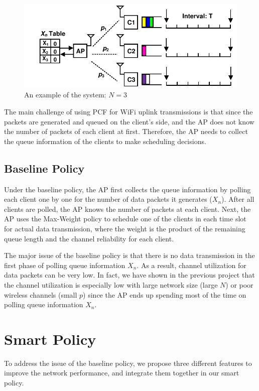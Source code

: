 \documentclass{article}
\begin{document}
\begin{figure}[htbp]
   \centering
   \includegraphics[width=\textwidth]{../presentation/network.pdf}
   \caption{An example of the system: $N=3$}
   \label{fig:network}
\end{figure}

The main challenge of using PCF for WiFi uplink transmissions is that since the packets are generated and queued on the client's side, and the AP does not know the number of packets of each client at first. Therefore, the AP needs to collect the queue information of the clients to make scheduling decisions.

\subsection{Baseline Policy}
Under the baseline policy, the AP first collects the queue information by polling each client one by one for the number of data packets it generates ($X_n$). After all clients are polled, the AP knows the number of packets at each client. Next, the AP uses the Max-Weight policy to schedule one of the clients in each time slot for actual data transmission, where the weight is the product of the remaining queue length and the channel reliability for each client.

The major issue of the baseline policy is that there is no data transmission in the first phase of polling queue information $X_n$. As a result, channel utilization for data packets can be very low. In fact, we have shown in the previous project that the channel utilization is especially low with large network size (large $N$) or poor wireless channels (small $p$) since the AP ends up spending most of the time on polling queue information $X_n$.

\section{Smart Policy}

To address the issue of the baseline policy, we propose three different features to improve the network performance, and integrate them together in our smart policy.
\end{document}
